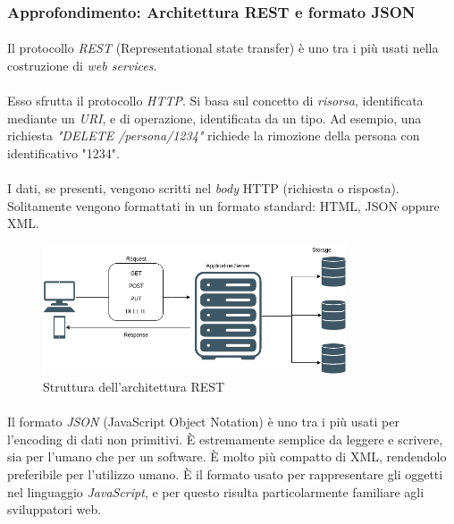 \documentclass[11pt,a4paper,english]{article}
\begin{document}
\subsubsection{Approfondimento: Architettura REST e formato JSON}

\paragraph{} Il protocollo \emph{REST} \cite{rest} (Representational state transfer) è uno tra i più usati nella costruzione di \emph{web services}. 

\paragraph{} Esso sfrutta il protocollo \emph{HTTP}. Si basa sul concetto di \emph{risorsa}, identificata mediante un \emph{URI}, e di operazione, identificata da un tipo. Ad esempio, una richiesta \emph{"DELETE /persona/1234"} richiede la rimozione della persona con identificativo "1234".

\paragraph{} I dati, se presenti, vengono scritti nel \emph{body} HTTP (richiesta o risposta). Solitamente vengono formattati in un formato standard: HTML, JSON oppure XML. 

\begin{figure}[H]
    \centering
    \includegraphics[width=0.8\textwidth]{img/rest.png}
    \caption{Struttura dell'architettura REST}
\end{figure}

\paragraph{} Il formato \emph{JSON} \cite{json} (JavaScript Object Notation) è uno tra i più usati per l'encoding di dati non primitivi. È estremamente semplice da leggere e scrivere, sia per l'umano che per un software. È molto più compatto di XML, rendendolo preferibile per l'utilizzo umano. È il formato usato per rappresentare gli oggetti nel linguaggio \emph{JavaScript}, e per questo risulta particolarmente familiare agli sviluppatori web. 
\end{document}
